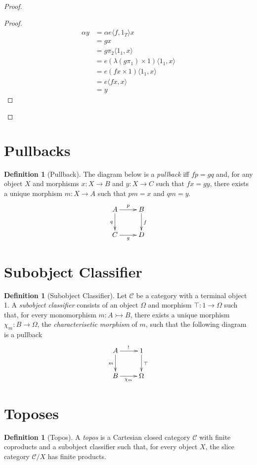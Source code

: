 \documentclass{article}
\let\qed\relax
\theoremstyle{definition}
\newtheorem{definition}[axiom]{Definition}
\begin{document}
\begin{proof}
    \pf
    \begin{proof}
        \pf
        \begin{align*}
            \alpha y & = \alpha e \langle f, 1_T \rangle x \\
            & = gx \\
            & = g \pi_2 \langle 1_1, x \rangle \\
            & = e (\lambda(g \pi_1) \times 1) \langle 1_1, x \rangle \\
            & = e (fx \times 1) \langle 1_1, x \rangle \\
            & = e \langle fx, x \rangle \\
            & = y
        \end{align*}
    \end{proof}
    \qed
\end{proof}

\section{Pullbacks}

\begin{definition}[Pullback]
    The diagram below is a \emph{pullback} iff $fp = gq$ and, for any object $X$ and morphisms $x : X \rightarrow B$
    and $y : X \rightarrow C$ such that $fx = gy$, there exists a unique morphism $m : X \rightarrow A$ such that $pm = x$
    and $qm = y$.
    \[ \xymatrix{
        A \ar[r]^p \ar[d]_q & B \ar[d]^{f} \\
        C \ar[r]_g & D
    } \]
\end{definition}

\section{Subobject Classifier}

\begin{definition}[Subobject Classifier]
    Let $\mathcal{C}$ be a category with a terminal object 1.
    A \emph{subobject classifier} consists of an object $\Omega$ and morphism $\top : 1 \rightarrow \Omega$
    such that, for every monomorphism $m : A \rightarrowtail B$, there exists a unique morphism
    $\chi_m : B \rightarrow \Omega$, the \emph{characterisetic morphism} of $m$, such that the following
    diagram is a pullback
    \[ \xymatrix{
        A \ar[r]^{!} \ar[d]_{m} & 1 \ar[d]^{\top} \\
        B \ar[r]_{\chi_m} & \Omega
    } \]
\end{definition}

\section{Toposes}

\begin{definition}[Topos]
    A \emph{topos} is a Cartesian closed category $\mathcal{C}$ with finite coproducts and a subobject
    classifier such that, for every object $X$, the slice category $\mathcal{C} / X$ has finite products.
\end{definition}
\end{document}
